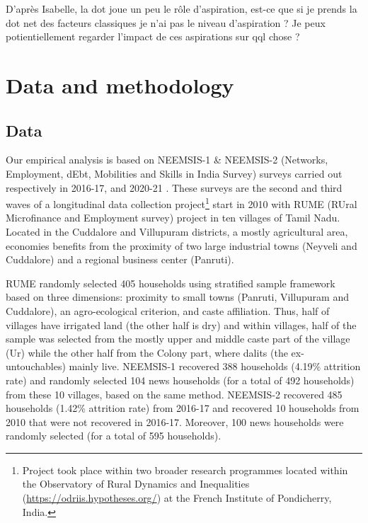 \documentclass[a4paper, 11pt, onecolumn]{article}
\begin{document}
D'après Isabelle, la dot joue un peu le rôle d'aspiration, est-ce que si je prends la dot net des facteurs classiques je n'ai pas le niveau d'aspiration ?
Je peux potientiellement regarder l'impact de ces aspirations sur qql chose ?




\section{Data and methodology}

	\subsection{Data}
	\label{subsection:data}

Our empirical analysis is based on NEEMSIS-1 \& NEEMSIS-2 (Networks, Employment, dEbt, Mobilities and Skills in India Survey) surveys carried out respectively in 2016-17, and 2020-21 \citep{NEEMSISreport, NEEMSIS2017}.
These surveys are the second and third waves of a longitudinal data collection project\footnote{Project took place within two broader research programmes located within the Observatory of Rural Dynamics and Inequalities (\url{https://odriis.hypotheses.org/}) at the French Institute of Pondicherry, India.} start in 2010 with RUME (RUral Microfinance and Employment survey) project in ten villages of Tamil Nadu.
Located in the Cuddalore and Villupuram districts, a mostly agricultural area, economies benefits from the proximity of two large industrial towns (Neyveli and Cuddalore) and a regional business center (Panruti).

RUME randomly selected 405 households using stratified sample framework based on three dimensions: proximity to small towns (Panruti, Villupuram and Cuddalore), an agro-ecological criterion, and caste affiliation.
Thus, half of villages have irrigated land (the other half is dry) and within villages, half of the sample was selected from the mostly upper and middle caste part of the village (Ur) while the other half from the Colony part, where dalits (the ex-untouchables) mainly live. 
NEEMSIS-1 recovered 388 households (4.19\% attrition rate) and randomly selected 104 news households (for a total of 492 households) from these 10 villages, based on the same method. 
NEEMSIS-2 recovered 485 households (1.42\% attrition rate) from 2016-17 and recovered 10 households from 2010 that were not recovered in 2016-17.
Moreover, 100 news households were randomly selected (for a total of 595 households).
\end{document}
